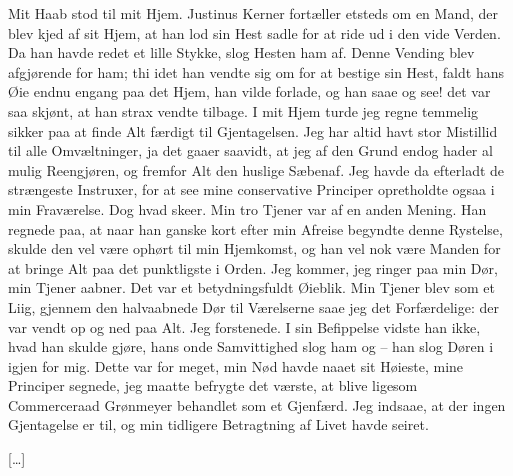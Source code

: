 \documentclass[12pt,a4paper]{article}
\begin{document}
Mit Haab stod til mit Hjem. Justinus Kerner fortæller etsteds om en Mand, der blev kjed af sit Hjem, at han lod sin Hest sadle for at ride ud i den vide Verden. Da han havde redet et lille Stykke, slog Hesten ham af. Denne Vending blev afgjørende for ham; thi idet han vendte sig om for at bestige sin Hest, faldt hans Øie endnu engang paa det Hjem, han vilde forlade, og han saae og see! det var saa skjønt, at han strax vendte tilbage. I mit Hjem turde jeg regne temmelig sikker paa at finde Alt færdigt til Gjentagelsen. Jeg har altid havt stor Mistillid til alle Omvæltninger, ja det gaaer saavidt, at jeg af den Grund endog hader al mulig Reengjøren, og fremfor Alt den huslige Sæbenaf. Jeg havde da efterladt de strængeste Instruxer, for at see mine conservative Principer opretholdte ogsaa i min Fraværelse. Dog hvad skeer. Min tro Tjener var af en anden Mening. Han regnede paa, at naar han ganske kort efter min Afreise begyndte denne Rystelse, skulde den vel være ophørt til min Hjemkomst, og han vel nok være Manden for at bringe Alt paa det punktligste i Orden. Jeg kommer, jeg ringer paa min Dør, min Tjener aabner. Det var et betydningsfuldt Øieblik. Min Tjener blev som et Liig, gjennem den halvaabnede Dør til Værelserne saae jeg det Forfærdelige: der var vendt op og ned paa Alt. Jeg forstenede. I sin Befippelse vidste han ikke, hvad han skulde gjøre, hans onde Samvittighed slog ham og – han slog Døren i igjen for mig. Dette var for meget, min Nød havde naaet sit Høieste, mine Principer segnede, jeg maatte befrygte det værste, at blive ligesom Commerceraad Grønmeyer behandlet som et Gjenfærd. Jeg indsaae, at der ingen Gjentagelse er til, og min tidligere Betragtning af Livet havde seiret.

[…]
\end{document}
